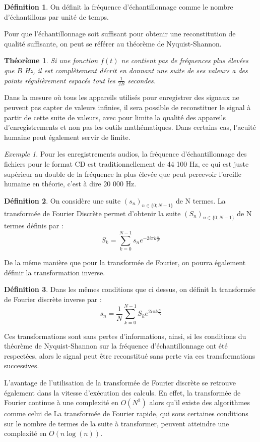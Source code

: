 \documentclass[]{article}
\newtheorem{mythm}{Théorème}
\theoremstyle{remark}
\newtheorem{myexmpl}{Exemple}
\theoremstyle{definition}
\newtheorem{mydef}{Définition}
\begin{document}
	\begin{mydef}
		On définit la fréquence d'échantillonnage comme le nombre d'échantillons par unité de temps.  
	\end{mydef}
		Pour que l'échantillonnage soit suffisant pour obtenir une reconstitution de qualité suffisante, on peut se référer au théorème de Nyquist-Shannon. 
		
	\begin{mythm}
		Si une fonction $f(t)$ ne contient pas de fréquences plus élevées que $B$ Hz, il est complètement décrit en donnant une suite de ses valeurs a des points régulièrement espacés tout les $\frac{1}{2B}$ secondes.
	\end{mythm}
	
	Dans la mesure où tous les appareils utilisés pour enregistrer des signaux ne peuvent pas capter de valeurs infinies, il sera possible de reconstituer le signal à partir de cette suite de valeurs, avec pour limite la qualité des appareils d'enregistrements et non pas les outils mathématiques. Dans certains cas, l'acuité humaine peut également servir de limite.
	
	\begin{myexmpl}
		 Pour les enregistrements audios, la fréquence d'échantillonnage des fichiers pour le format CD est traditionnellement de 44 100 Hz, ce qui est juste supérieur au double de la fréquence la plus élevée que peut percevoir l'oreille humaine en théorie, c'est à dire 20 000 Hz. 
	\end{myexmpl}
	
	\begin{mydef}
			On considère une suite $(s_n)_{n\in \{0; N -1 \}}$ de N termes. La transformée de Fourier Discrète permet d'obtenir la suite  $(S_n)_{n\in \{0; N -1 \}}$ de N termes définis par :
			$$ S_k = \sum_{k=0}^{N-1}s_n e^{-2i\pi k\frac{n}{N}} $$
	\end{mydef}
		De la même manière que pour la transformée de Fourier, on pourra également définir la transformation inverse.
		
	\begin{mydef}
		Dans les mêmes conditions que ci dessus, on définit la transformée de Fourier discrète inverse par :
			$$ s_n =\frac{1}{N} \sum_{k=0}^{N-1}S_k e^{2i\pi k\frac{n}{N}} $$
	\end{mydef}
	
	Ces transformations sont sans pertes d'informations, ainsi, si les conditions du théorème de Nyquist-Shannon sur la fréquence d'échantillonnage ont été respectées, alors le signal peut être reconstitué sans perte via ces transformations successives. 
	
	L'avantage de l'utilisation de la transformée de Fourier discrète se retrouve également dans la vitesse d'exécution des calculs. En effet, la transformée de Fourier continue à une complexité en $O(N^2)$ alors qu'il existe des algorithmes comme celui de La transformée de Fourier rapide, qui sous certaines conditions sur le nombre de termes de la suite à transformer, peuvent atteindre une complexité en $O(n\log(n))$.
\end{document}
